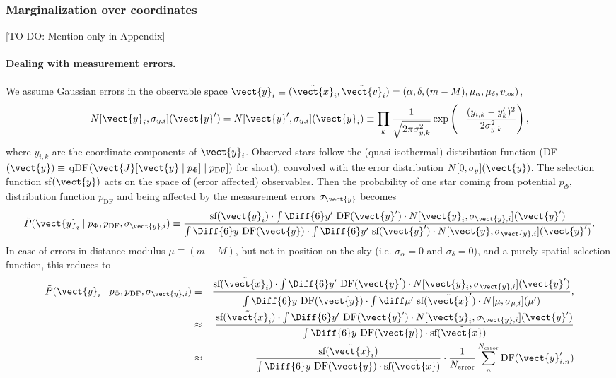 
\subsubsection{Marginalization over coordinates}
[TO DO: Mention only in Appendix]

\paragraph{Dealing with measurement errors.} 

We assume Gaussian errors in the observable space $\vect{y}_i \equiv (\tilde{\vect{x}}_i,\tilde{\vect{v}}_i)=(\alpha,\delta,(m-M),\mu_\alpha,\mu_\delta,v_\text{los})$,
\begin{equation*}
N[\vect{y}_i,\sigma_{y,i}](\vect{y}') = N[\vect{y}',\sigma_{y,i}](\vect{y}_i) \equiv  \prod_k \frac{1}{\sqrt{2\pi\sigma_{y,k}^2}} \exp\left( -\frac{(y_{i,k}-y_k')^2}{2\sigma_{y,k}^2}\right),
\end{equation*}
where $y_{i,k}$ are the coordinate components of $\vect{y}_i$. Observed stars follow the (quasi-isothermal) distribution function (DF$(\vect{y}) \equiv$ qDF$(\vect{J}[\vect{y} \mid p_\Phi] \mid p_\text{DF}])$ for short), convolved with the error distribution $N[0,\sigma_{y}](\vect{y})$. The selection function sf$(\vect{y})$ acts on the space of (error affected) observables. 
Then the probability of one star coming from potential $p_\Phi$, distribution function $p_\text{DF}$ and being affected by the measurement errors $\sigma_{\vect{y}}$ becomes
\begin{eqnarray*}
\tilde{P}(\vect{y}_i \mid p_\Phi,p_\text{DF},\sigma_{\vect{y},i}) \equiv \frac{\text{sf}(\vect{y}_i) \cdot \int \Diff{6} y' \  \text{DF}(\vect{y}') \cdot N[\vect{y}_i,\sigma_{\vect{y},i}](\vect{y}')}{\int \Diff{6}y  \  \text{DF}(\vect{y})  \cdot  \int \Diff{6} y' \  \text{sf}(\vect{y}')  \cdot N[\vect{y},\sigma_{\vect{y},i}](\vect{y}')}.
\end{eqnarray*}
In case of errors in distance modulus $\mu \equiv (m-M)$, but not in position on the sky (i.e. $\sigma_\alpha = 0$ and $\sigma_\delta = 0$), and a purely spatial selection function, this reduces to
\begin{eqnarray}
\tilde{P}(\vect{y}_i \mid p_\Phi,p_\text{DF},\sigma_{\vect{y},i}) &\equiv& \frac{\text{sf}(\tilde{\vect{x}}_i) \cdot \int \Diff{6} y' \  \text{DF}(\vect{y}') \cdot N[\vect{y}_i,\sigma_{\vect{y},i}](\vect{y}')}{\int \Diff{6}y  \  \text{DF}(\vect{y})  \cdot  \int \diff \mu' \  \text{sf}(\tilde{\vect{x}}')  \cdot N[\mu,\sigma_{\mu,i}](\mu')},\nonumber\\
&\approx& \frac{\text{sf}(\tilde{\vect{x}}_i) \cdot \int \Diff{6} y' \  \text{DF}(\vect{y}') \cdot N[\vect{y}_i,\sigma_{\vect{y},i}](\vect{y}')}{\int \Diff{6}y  \  \text{DF}(\vect{y})  \cdot   \text{sf}(\tilde{\vect{x}})}\label{eq:errapprox}\\
&\approx& \frac{ \text{sf}(\tilde{\vect{x}}_i)}{\int \Diff{6}y  \  \text{DF}(\vect{y})  \cdot   \text{sf}(\tilde{\vect{x}})} \cdot \frac{1}{N_\text{error}} \sum_n^{N_\text{error}}  \text{DF}(\vect{y}'_{i,n}) \label{eq:errMC}
\end{eqnarray}
